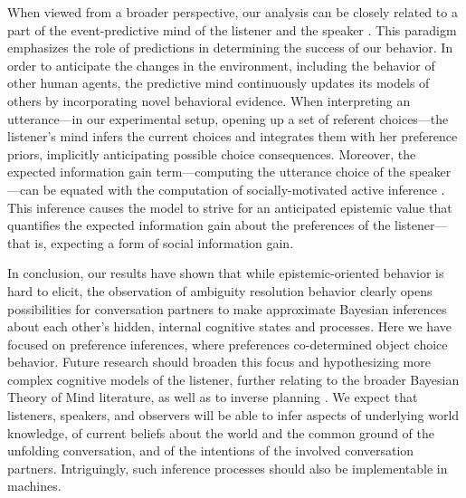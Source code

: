 \documentclass[11pt,a4paper]{article}
\begin{document}
When viewed from a broader perspective, our analysis can be closely related to a part of the event-predictive mind of the listener and the speaker \cite{Butz:2016,Butz:2017,Butz:2020tsi,Zacks:2007}.
This paradigm emphasizes the role of predictions in determining the success of our behavior.
In order to anticipate the changes in the environment, including the behavior of other human agents, the predictive mind continuously updates its models of others by incorporating novel behavioral evidence.
When interpreting an utterance---in our experimental setup, opening up a set of referent choices---the listener's mind infers the current choices and integrates them with her preference priors, implicitly anticipating possible choice consequences.
Moreover, the expected information gain term---computing the utterance choice of the speaker---can be equated with the computation of socially-motivated active inference \cite{Butz:2017a, Clark:2016, Friston:2015}.
This inference causes the model to strive for an anticipated epistemic value that quantifies the expected information gain about the preferences of the listener---that is, expecting a form of social information gain. 


In conclusion, our results have shown that while epistemic-oriented behavior is hard to elicit, the observation of ambiguity resolution behavior clearly opens possibilities for conversation partners to make approximate Bayesian inferences about each other's hidden, internal cognitive states and processes.
Here we have focused on preference inferences, where preferences co-determined object choice behavior. 
Future research should broaden this focus and hypothesizing more complex cognitive models of the listener, further relating to the broader Bayesian Theory of Mind literature, as well as to inverse planning \cite{Baker:2009,Russell:2020}. 
We expect that listeners, speakers, and observers will be able to infer aspects of underlying world knowledge, of current beliefs about the world and the common ground of the unfolding conversation, and of the intentions of the involved conversation partners. 
Intriguingly, such inference processes should also be implementable in machines.  
 
\end{document}
